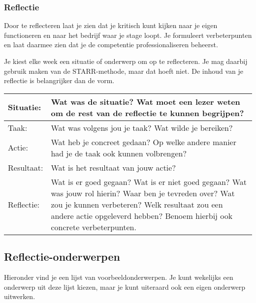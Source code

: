 \documentclass[a4paper,12pt]{article}
\begin{document}
\subsubsection*{Reflectie}
Door te reflecteren laat je zien dat je kritisch kunt kijken naar je eigen functioneren en naar het bedrijf waar je stage loopt. Je formuleert verbeterpunten en laat daarmee zien dat je de competentie professionaliseren beheerst.

Je kiest elke week een situatie of onderwerp om op te reflecteren. Je mag daarbij gebruik maken van de STARR-methode, maar dat hoeft niet. De inhoud van je reflectie is belangrijker dan de vorm.

\begin{longtable}{|l|p{}|}
\hline
Situatie:   & Wat was de situatie? Wat moet een lezer weten om de rest van de reflectie te kunnen begrijpen? \\ \hline
Taak:   & Wat was volgens jou je taak? Wat wilde je bereiken?  \\ \hline
Actie:  & Wat heb je concreet gedaan? Op welke andere manier had je de taak ook kunnen volbrengen? \\ \hline
Resultaat: & Wat is het resultaat van jouw actie? \\ \hline
Reflectie:   & Wat is er goed gegaan? Wat is er niet goed gegaan? Wat was jouw rol hierin? Waar ben je tevreden over? Wat zou je kunnen verbeteren? Welk resultaat zou een andere actie opgeleverd hebben? Benoem hierbij ook concrete verbeterpunten. \\ \hline

\hline

\end{longtable}

\subsection*{Reflectie-onderwerpen}
Hieronder vind je een lijst van voorbeeldonderwerpen. Je kunt wekelijks een onderwerp uit deze lijst kiezen, maar je kunt uiteraard ook een eigen onderwerp uitwerken.
\end{document}
